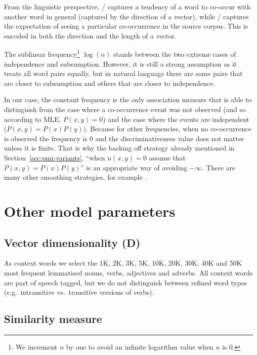 From the linguistic perspective, \PMI/ captures a tendency of a word to co-occur with another word in general (captured by the direction of a vector), while \NPMI/ captures the expectation of seeing a particular co-occurrence in the source corpus. This is encoded in both the direction and the length of a vector.

The sublinear frequency\footnote{We increment $n$ by one to avoid an infinite logarithm value when $n$ is 0.} $\log(n)$ stands between the two extreme cases of independence and subsumption. However, it is still a strong assumption as it treats all word pairs equally, but in natural language there are some pairs that are closer to subsumption and others that are closer to independence.

In our case, the constant frequency is the only association measure that is able to distinguish from the case where a co-occurrence event was not observed (and so according to MLE, $P(x, y)= 0$) and the case where the events are independent ($P(x, y) = P(x)P(y)$). Because for other frequencies, when no co-occurrence is observed the frequency is 0 and the discriminativeness value does not matter unless it is finite. That is why the backing off strategy already mentioned in Section~\ref{sec:pmi-variants}, ``when $n(x, y) = 0$ assume that $P(x, y) = P(x)P(y)$'' is an appropriate way of avoiding $-\infty$. There are many other smoothing strategies, for example .

\section{Other model parameters}
\label{sec:other-model-paramt}

\subsection{Vector dimensionality (D)}
\label{sec:vect-dimens}

As context words we select the 1K, 2K, 3K, 5K, 10K, 20K, 30K, 40K and 50K most frequent lemmatised nouns, verbs, adjectives and adverbs. All context words are part of speech tagged, but we do not distinguish between refined word types (e.g.~intransitive vs.~transitive versions of verbs).

\subsection{Similarity measure}
\label{sec:similarity-measure}

